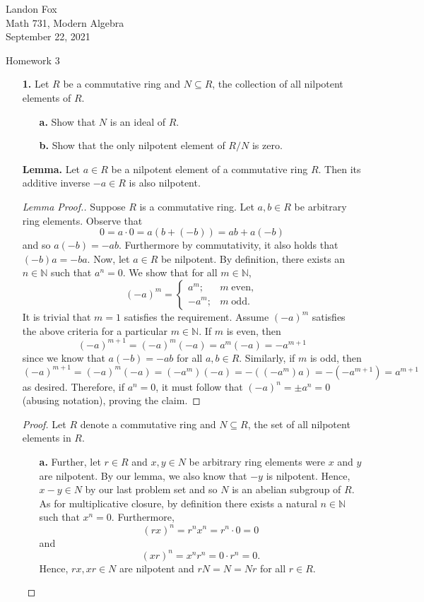 \documentclass[ 12pt ]{article}
\begin{document}
\noindent Landon Fox \\
\noindent Math 731, Modern Algebra \\
\noindent September 22, 2021

\begin{center}
\Large Homework 3
\end{center}

\begin{enumerate}
	\item[\textbf{1.}] Let $R$ be a commutative ring and $N \subseteq R$, the collection of all nilpotent elements of $R$.
		\begin{enumerate}
			\item[\textbf{a.}] Show that $N$ is an ideal of $R$.
			\item[\textbf{b.}] Show that the only nilpotent element of $R/N$ is zero.
		\end{enumerate}

		\textbf{Lemma.} Let $a \in R$ be a nilpotent element of a commutative ring $R$. Then its additive inverse $-a \in R$ is also nilpotent.

		\begin{proof}[Lemma Proof.]
			Suppose $R$ is a commutative ring. Let $a, b \in R$ be arbitrary ring elements. Observe that $$0 = a \cdot 0 = a(b + (-b)) = ab + a(-b)$$ and so $a(-b) = -ab$. Furthermore by commutativity, it also holds that $(-b)a = -ba$. Now, let $a \in R$ be nilpotent. By definition, there exists an $n \in \mathbb{N}$ such that $a^n = 0$. We show that for all $m \in \mathbb{N}$, $$(-a)^m = \begin{cases} a^m; & m\; \mathrm{even}, \\ -a^m; & m\; \mathrm{odd}. \end{cases}$$ It is trivial that $m = 1$ satisfies the requirement. Assume $(-a)^m$ satisfies the above criteria for a particular $m \in \mathbb{N}$. If $m$ is even, then $$(-a)^{m+1} = (-a)^m (-a) = a^m (-a) = -a^{m+1}$$ since we know that $a(-b) = -ab$ for all $a, b \in R$. Similarly, if $m$ is odd, then $$(-a)^{m+1} = (-a)^m (-a) = (-a^m) (-a) = -((-a^m)a) = -(-a^{m + 1}) = a^{m+1}$$ as desired. Therefore, if $a^n = 0$, it must follow that $(-a)^n = \pm a^n = 0$ (abusing notation), proving the claim.
		\end{proof}

		\begin{proof}
			Let $R$ denote a commutative ring and $N \subseteq R$, the set of all nilpotent elements in $R$.
			\begin{enumerate}
				\item[\textbf{a.}] Further, let $r \in R$ and $x, y \in N$ be arbitrary ring elements were $x$ and $y$ are nilpotent. By our lemma, we also know that $-y$ is nilpotent. Hence, $x - y \in N$ by our last problem set and so $N$ is an abelian subgroup of $R$. As for multiplicative closure, by definition there exists a natural $n \in \mathbb{N}$ such that $x^n = 0$. Furthermore, $$(rx)^n = r^n x^n = r^n \cdot 0 = 0$$ and $$(xr)^n = x^n r^n = 0 \cdot r^n = 0.$$ Hence, $rx, xr \in N$ are nilpotent and $rN = N = Nr$ for all $r \in R$.


\end{enumerate}
\end{proof}
\end{enumerate}
\end{document}
